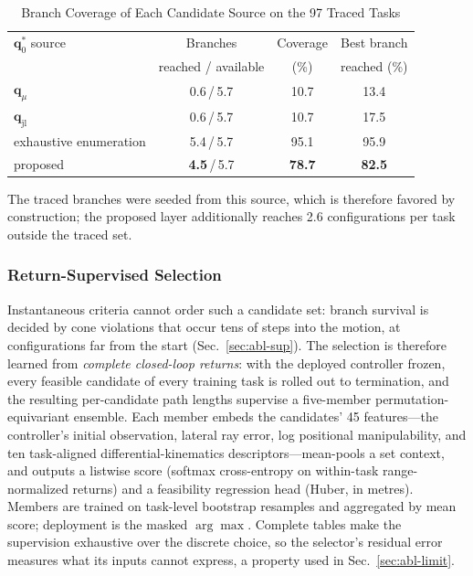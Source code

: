 \documentclass[journal]{IEEEtran}
\begin{document}
\begin{table}[!t]
\caption{Branch Coverage of Each Candidate Source on the 97 Traced Tasks}
\label{tab:branch}
\centering
\footnotesize
\setlength{\tabcolsep}{3.5pt}
\begin{threeparttable}
\begin{tabular}{lccc}
\toprule
$\mathbf{q}^{*}_{0}$ source & Branches & Coverage & Best branch\\
 & {\scriptsize reached / available} & {\scriptsize (\%)}
 & {\scriptsize reached (\%)}\\
\midrule
$\mathbf{q}_{\mu}$ & 0.6\,/\,5.7 & 10.7 & 13.4\\
$\mathbf{q}_{\mathrm{jl}}$ & 0.6\,/\,5.7 & 10.7 & 17.5\\
exhaustive enumeration\tnote{1} & 5.4\,/\,5.7 & 95.1 & 95.9\\
proposed & \textbf{4.5}\,/\,5.7 & \textbf{78.7} & \textbf{82.5}\\
\bottomrule
\end{tabular}
\begin{tablenotes}
\item[1] The traced branches were seeded from this source, which is
therefore favored by construction; the proposed layer additionally
reaches 2.6 configurations per task outside the traced set.
\end{tablenotes}
\end{threeparttable}
\end{table}

\subsubsection{Return-Supervised Selection}
Instantaneous criteria cannot order such a candidate set: branch
survival is decided by cone violations that occur tens of steps into the
motion, at configurations far from the start
(Sec.~\ref{sec:abl-sup}). The selection is therefore learned from
\textit{complete closed-loop returns}: with the deployed controller
frozen, every feasible candidate of every training task is rolled out to
termination, and the resulting per-candidate path lengths supervise a
five-member permutation-equivariant ensemble. Each member embeds the
candidates' 45 features---the controller's initial observation, lateral
ray error, log positional manipulability, and ten task-aligned
differential-kinematics descriptors---mean-pools a set context, and
outputs a listwise score (softmax cross-entropy on within-task
range-normalized returns) and a feasibility regression head (Huber, in
metres). Members are trained on task-level bootstrap resamples and
aggregated by mean score; deployment is the masked $\arg\max$. Complete
tables make the supervision exhaustive over the discrete choice, so the
selector's residual error measures what its inputs cannot express, a
property used in Sec.~\ref{sec:abl-limit}.
\end{document}
